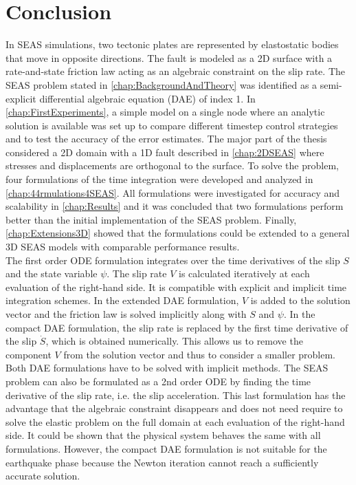 \chapter{Conclusion}
\label{chap:Conclusion}

In SEAS simulations, two tectonic plates are represented by elastostatic bodies that move in opposite directions. The fault is modeled as a 2D surface with a rate-and-state friction law acting as an algebraic constraint on the slip rate. The SEAS problem stated in \autoref{chap:BackgroundAndTheory} was identified as a semi-explicit differential algebraic equation (DAE) of index 1. In \autoref{chap:FirstExperiments}, a simple model on a single node where an analytic solution is available was set up to compare different timestep control strategies and to test the accuracy of the error estimates. The major part of the thesis considered a 2D domain with a 1D fault described in \autoref{chap:2DSEAS} where stresses and displacements are orthogonal to the surface. To solve the problem, four formulations of the time integration were developed and analyzed in \autoref{chap:44rmulations4SEAS}. All formulations were investigated for accuracy and scalability in \autoref{chap:Results} and it was concluded that two formulations perform better than the initial implementation of the SEAS problem. Finally, \autoref{chap:Extensions3D} showed that the formulations could be extended to a general 3D SEAS models with comparable performance results. \\

The first order ODE formulation integrates over the time derivatives of the slip $S$ and the state variable $\psi$. The slip rate $V$ is calculated iteratively at each evaluation of the right-hand side. It is compatible with explicit and implicit time integration schemes. In the extended DAE formulation, $V$ is added to the solution vector and the friction law is solved implicitly along with $S$ and $\psi$. In the compact DAE formulation, the slip rate is replaced by the first time derivative of the slip $\dot{S}$, which is obtained numerically. This allows us to remove the component $V$ from the solution vector and thus to consider a smaller problem. Both DAE formulations have to be solved with implicit methods. The SEAS problem can also be formulated as a 2nd order ODE by finding the time derivative of the slip rate, i.e. the slip acceleration. This last formulation has the advantage that the algebraic constraint disappears and does not need require to solve the elastic problem on the full domain at each evaluation of the right-hand side. It could be shown that the physical system behaves the same with all formulations. However, the compact DAE formulation is not suitable for the earthquake phase because the Newton iteration cannot reach a sufficiently accurate solution. \\

